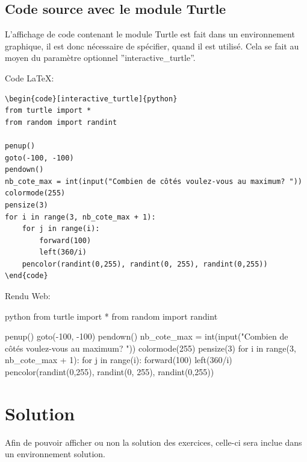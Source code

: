 \documentclass[a4paper,11pt]{article}
\begin{document}
\subsection{Code source avec le module Turtle}
L’affichage de code contenant le module Turtle est fait dans un environnement graphique, il est
donc nécessaire de spécifier, quand il est utilisé. Cela se fait au moyen du paramètre optionnel
”interactive_turtle”.\par

Code LaTeX:
\begin{lstlisting}
\begin{code}[interactive_turtle]{python}
from turtle import *
from random import randint

penup()
goto(-100, -100)
pendown()
nb_cote_max = int(input("Combien de côtés voulez-vous au maximum? "))
colormode(255)
pensize(3)
for i in range(3, nb_cote_max + 1):
    for j in range(i):
        forward(100)
        left(360/i)
    pencolor(randint(0,255), randint(0, 255), randint(0,255))
\end{code}
\end{lstlisting}

Rendu Web:\par
\begin{code}{python}
from turtle import *
from random import randint

penup()
goto(-100, -100)
pendown()
nb_cote_max = int(input("Combien de côtés voulez-vous au maximum? "))
colormode(255)
pensize(3)
for i in range(3, nb_cote_max + 1):
    for j in range(i):
        forward(100)
        left(360/i)
    pencolor(randint(0,255), randint(0, 255), randint(0,255))
\end{code}

\section{Solution}
Afin de pouvoir afficher ou non la solution des exercices, celle-ci sera inclue dans un environnement solution.\par
\end{document}

